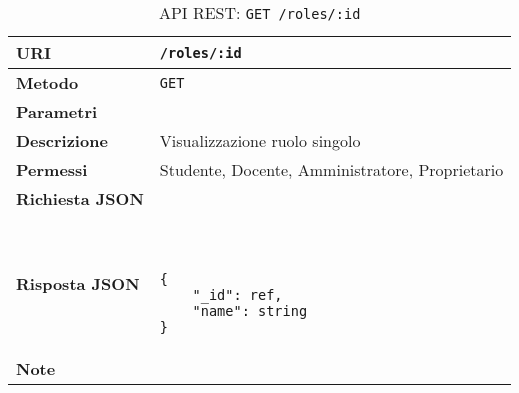         \begin{table}[H]
            \begin{center}
                \begin{tabular}{p{} p{}}
                    \toprule
                    \textbf{URI} & \texttt{/roles/:id} \\ \midrule
                    \textbf{Metodo} & \texttt{GET} \\ \midrule
                    \textbf{Parametri} & \\ \midrule
                    \textbf{Descrizione} & Visualizzazione ruolo singolo \\ \midrule
                    \textbf{Permessi} & Studente, Docente, Amministratore, Proprietario  \\ \midrule
                    \textbf{Richiesta JSON} & \\ \midrule
                    \textbf{Risposta JSON} & \
                        \begin{lstlisting}[basicstyle={\ttfamily}]
{
    "_id": ref,
    "name": string
}
                        \end{lstlisting}
                        \\ \midrule
                    \textbf{Note} & \\
                    \bottomrule
                \end{tabular}
                \caption{API REST: \texttt{GET /roles/:id}}
            \end{center}
        \end{table}
